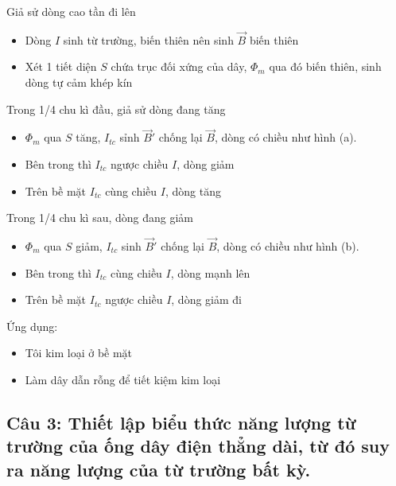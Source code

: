 \newpage

\begin{figure*}[h]
  \centering
  \qquad
\end{figure*}

Giả sử dòng cao tần đi lên

\begin{itemize}
  \item Dòng $I$ sinh từ trường, biến thiên nên sinh $\vec{B}$ biến thiên
  \item Xét 1 tiết diện $S$ chứa trục đối xứng của dây, $\Phi_m$ qua đó biến thiên, sinh dòng tự cảm khép kín
\end{itemize}

Trong 1/4 chu kì đầu, giả sử dòng đang tăng

\begin{itemize}
  \item $\Phi_m$ qua $S$ tăng, $I_{tc}$ sỉnh $\vec{B}'$ chống lại $\vec{B}$, dòng có chiều như hình (a).
  \item Bên trong thì $I_{tc}$ ngược chiều $I$, dòng giảm
  \item Trên bề mặt $I_{tc}$ cùng chiều $I$, dòng tăng 
\end{itemize}

Trong 1/4 chu kì sau, dòng đang giảm

\begin{itemize}
  \item $\Phi_m$ qua $S$ giảm, $I_{tc}$ sinh $\vec{B}'$ chống lại $\vec{B}$, dòng có chiều như hình (b).
  \item Bên trong thì $I_{tc}$ cùng chiều $I$, dòng mạnh lên
  \item Trên bề mặt $I_{tc}$ ngược chiều $I$, dòng giảm đi
\end{itemize}

Ứng dụng:

\begin{itemize}
  \item Tôi kim loại ở bề mặt
  \item Làm dây dẫn rỗng để tiết kiệm kim loại
\end{itemize}

\subsection[Câu 3]{Câu 3: Thiết lập biểu thức năng lượng từ trường của ống dây điện thẳng dài, từ đó suy ra năng lượng của từ trường bất kỳ.}

